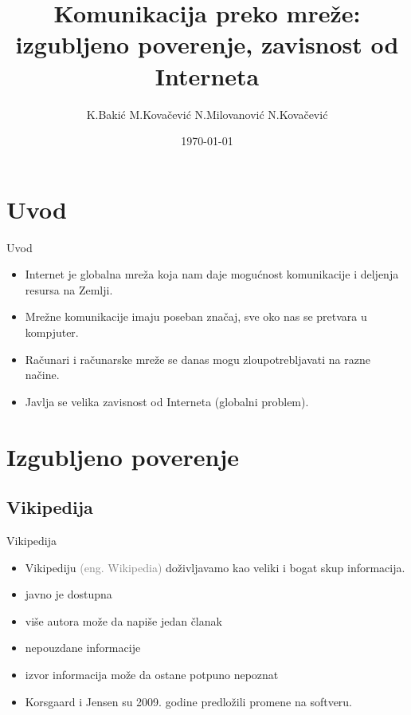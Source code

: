 \documentclass{beamer}
\title[\color{gray}Komunikacija preko mreže]{Komunikacija preko mreže:\\izgubljeno poverenje, zavisnost od Interneta}
\author{K.Bakić M.Kovačević N.Milovanović N.Kovačević}
\institute{Matematički fakultet, Beograd}
\date{\today}
\begin{document}
	\begin{frame}
	
	  \titlepage
	\end{frame}

	
	\section{Uvod}
		\begin{frame}{Uvod}
			\begin{itemize}
				\item Internet je globalna mreža koja nam daje mogućnost komunikacije i deljenja resursa na Zemlji. 
				\item Mrežne komunikacije imaju poseban značaj, sve oko nas se pretvara u kompjuter.
				\item Računari i računarske mreže se danas mogu zloupotrebljavati na razne načine.
				\item Javlja se velika zavisnost od Interneta (globalni problem).
			\end{itemize}
		\end{frame}
	\section{Izgubljeno poverenje}
		\subsection*{Vikipedija}
			\begin{frame}{Vikipedija}
			\begin{itemize}
				\item Vikipediju \textcolor{gray}{(eng. Wikipedia)} doživljavamo kao veliki i bogat skup informacija.
				\item javno je dostupna
				\item više autora može da napiše jedan članak		
				\item nepouzdane informacije	 
				\item izvor informacija može da ostane potpuno nepoznat
				\item Korsgaard i Jensen su 2009. godine predložili promene na softveru.
			 \end{itemize}
			\end{frame}
	
\end{document}
